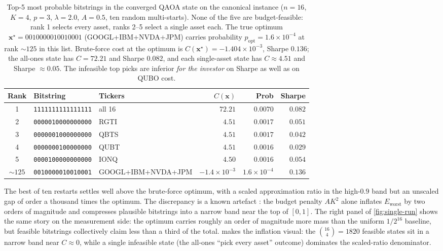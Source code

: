 \begin{table}[!t]
    \centering
    \small
    \caption{Top-5 most probable bitstrings in the converged QAOA state on the canonical instance ($n=16$, $K=4$, $p=3$, $\lambda=2.0$, $A=0.5$, ten random multi-starts). None of the five are budget-feasible: rank 1 selects every asset, ranks 2--5 select a single asset each. The true optimum $\boldsymbol x^\star = 0010000010010001$ (GOOGL+IBM+NVDA+JPM) carries probability $p_{\text{opt}} = 1.6\times 10^{-4}$ at rank $\sim 125$ in this list. Brute-force cost at the optimum is $C(\boldsymbol x^\star) = -1.404\times 10^{-3}$, Sharpe $0.136$; the all-ones state has $C = 72.21$ and Sharpe $0.082$, and each single-asset state has $C \approx 4.51$ and Sharpe $\approx 0.05$. The infeasible top picks are inferior \emph{for the investor} on Sharpe as well as on QUBO cost.}
    \label{tab:top5}
    \begin{tabular}{@{}cllrrr@{}}
        \toprule
        Rank & Bitstring & Tickers & $C(\boldsymbol x)$ & Prob & Sharpe \\
        \midrule
        1 & \texttt{1111111111111111} & all 16    & $72.21$ & $0.0070$ & $0.082$ \\
        2 & \texttt{0000010000000000} & RGTI      & $4.51$  & $0.0017$ & $0.051$ \\
        3 & \texttt{0000001000000000} & QBTS      & $4.51$  & $0.0017$ & $0.042$ \\
        4 & \texttt{0000000100000000} & QUBT      & $4.51$  & $0.0016$ & $0.029$ \\
        5 & \texttt{0000100000000000} & IONQ      & $4.50$  & $0.0016$ & $0.054$ \\
        \midrule
        $\sim 125$ & \texttt{0010000010010001} & GOOGL+IBM+NVDA+JPM & $-1.4\!\times\!10^{-3}$ & $1.6\!\times\!10^{-4}$ & $\mathbf{0.136}$ \\
        \bottomrule
    \end{tabular}
\end{table}

The best of ten restarts settles well above the brute-force optimum, with a scaled approximation ratio in the high-$0.9$ band but an unscaled gap of order a thousand times the optimum. The discrepancy is a known artefact \parencite{stopfer2025benchmark}: the budget penalty $AK^2$ alone inflates $E_{\text{worst}}$ by two orders of magnitude and compresses plausible bitstrings into a narrow band near the top of $[0,1]$. The right panel of \cref{fig:single-run} shows the same story on the measurement side: the optimum carries roughly an order of magnitude more mass than the uniform $1/2^{16}$ baseline, but feasible bitstrings collectively claim less than a third of the total.  makes the inflation visual: the $\binom{16}{4} = 1820$ feasible states sit in a narrow band near $C \approx 0$, while a single infeasible state (the all-ones ``pick every asset'' outcome) dominates the scaled-ratio denominator.

